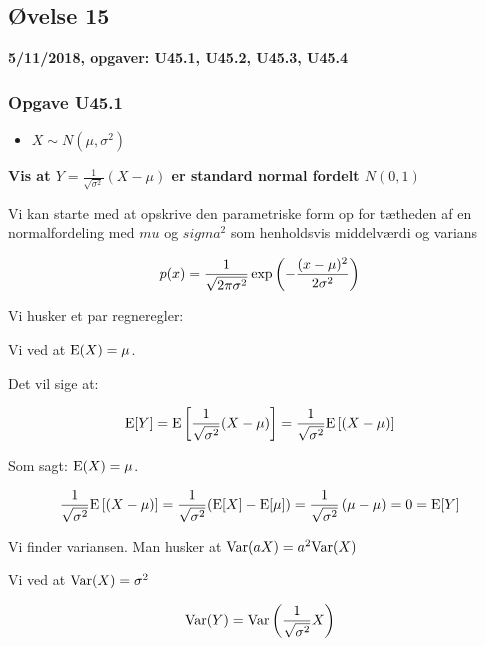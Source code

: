 \horizline

\subsection{Øvelse 15}

\textbf{5/11/2018, opgaver: U45.1, U45.2, U45.3, U45.4}

\subsubsection{Opgave U45.1}

\begin{itemize}
    \item $X \sim N(\mu, \sigma^2)$
\end{itemize}

\textbf{Vis at $Y=\frac{1}{\sqrt{\sigma^2}}(X -\mu)$ er standard normal fordelt $N(0,1)$}

Vi kan starte med at opskrive den parametriske form op for tætheden af en normalfordeling med $mu$ og $sigma^2$ som henholdsvis middelværdi og varians

\begin{equation}
    p(x) = \frac{1}{\sqrt{2 \pi \sigma^2}} \exp \left(-\frac{(x- \mu)^2}{2\sigma^2} \right) 
\end{equation}

Vi husker et par regneregler:

Vi ved at $\text{E}(X) = \mu$.

Det vil sige at:

\begin{equation}
    \text{E}[Y] = \text{E} \left[ \frac{1}{\sqrt{\sigma^2}}(X -\mu) \right] = \frac{1}{\sqrt{\sigma^2}} \text{E} \left[ (X -\mu)  \right]
\end{equation}

Som sagt: $\text{E}(X) = \mu$.

\begin{equation}
    \frac{1}{\sqrt{\sigma^2}} \text{E} \left[ (X -\mu)  \right] =\frac{1}{\sqrt{\sigma^2}}( \text{E}[X] - \text{E}[\mu]) =\frac{1}{\sqrt{\sigma^2}}  \left( \mu - \mu \right) = 0 = \text{E}[Y] 
\end{equation}

Vi finder variansen. Man husker at $\text{Var}(aX) = a^2 \text{Var}(X) $

Vi ved at $\text{Var}(X) = \sigma^2$

\begin{equation}
    \text{Var}(Y) = \text{Var}\left( \frac{1}{\sqrt{\sigma^2}}X\right)
\end{equation}


